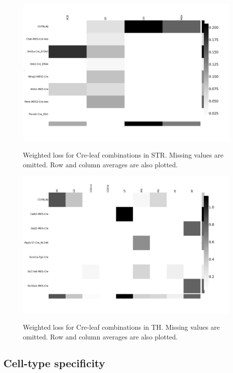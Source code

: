 \begin{figure}[H]
    \centering
    \includegraphics[width = 7in]{figs/lossdetails_477.png} 
    \label{fig:distances}
    \caption{Weighted loss for Cre-leaf combinations in STR. Missing values are omitted.   Row and column averages are also plotted.}
\end{figure}

\begin{figure}[H]
    \centering
    \includegraphics[width = 7in]{figs/lossdetails_549.png} 
    \label{fig:distances}
    \caption{Weighted loss for Cre-leaf combinations in TH. Missing values are omitted.   Row and column averages are also plotted.}
\end{figure}

\newpage

\subsection{Cell-type specificity}

